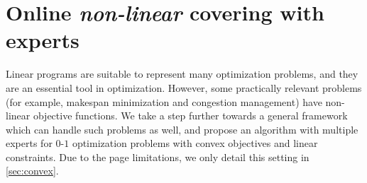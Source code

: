 \section{Online \emph{non-linear} covering with experts}

Linear programs are suitable to represent many optimization problems, and they are an essential tool in optimization. However, some practically relevant problems (for example, makespan minimization and congestion management) have non-linear objective functions. We take a step further towards a general framework which can handle such problems as well, and propose an algorithm with multiple experts for $0$-$1$ optimization problems with convex objectives and linear constraints. Due to the page limitations, we only detail this setting in \cref{sec:convex}.
